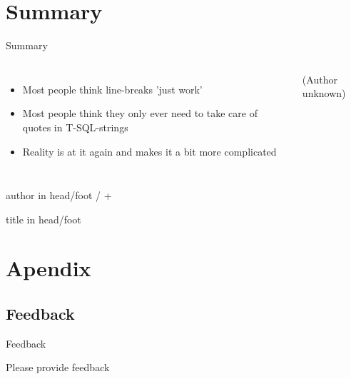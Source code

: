 \documentclass[english,aspectratio=169]{beamer}
\begin{document}
\section{Summary}

\begin{frame}{Summary}
\begin{columns}
    \begin{itemize}
        \item Most people think line-breaks 'just work'
        \item Most people think they only ever need to take care of quotes in T-SQL-strings
        \item Reality is at it again and makes it a bit more complicated
    \end{itemize}
        \begin{center}
            \tiny(Author unknown)
        \end{center}
\end{columns}
\end{frame}

\appendix
{%
\begin{beamercolorbox}[wd=0.5\textwidth,ht=3ex,dp=1.5ex,leftskip=.5em,rightskip=.5em]{author in head/foot}%
%
\insertframenumber{} / \insertmainframenumber{} + \insertappendixframenumber{}\hfill\insertshortauthor%
\end{beamercolorbox}%
\vspace*{-4.5ex}\hspace*{0.5\textwidth}%
\begin{beamercolorbox}[wd=0.5\textwidth,ht=3ex,dp=1.5ex,left,leftskip=.5em]{title in head/foot}%
%
\insertshorttitle%
\end{beamercolorbox}%
}
\beamerdefaultoverlayspecification{}

\section*{Apendix}

\subsection*{Feedback}
\begin{frame}{Feedback}
\begin{center}
{  Please provide feedback}
\end{center}
\end{frame}
\end{document}
